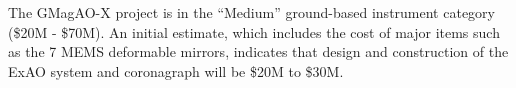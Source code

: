 \documentclass[12pt,preprint]{aastex}
\begin{document}
The GMagAO-X project is in the ``Medium'' ground-based instrument category (\$20M - \$70M).  An initial estimate, which includes the cost of major items such as the 7 MEMS deformable mirrors, indicates that design and construction of the ExAO system and coronagraph will be \$20M to \$30M.   



\clearpage
\thispagestyle{empty}
\end{document}
